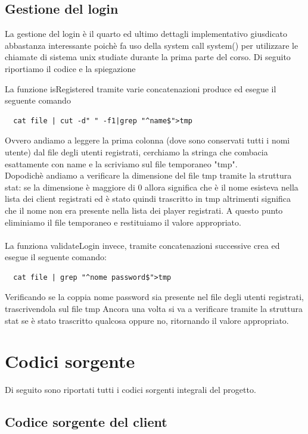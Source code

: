 \documentclass[a4paper]{article}
\begin{document}
\subsection{Gestione del login}
La gestione del login è il quarto ed ultimo dettagli implementativo giusdicato abbastanza interessante poichè
fa uso della system call system() per utilizzare le chiamate di sistema unix studiate durante la prima parte del corso.
Di seguito riportiamo il codice e la spiegazione

La funzione isRegistered tramite varie concatenazioni produce ed esegue il seguente comando 
\begin{verbatim}
  cat file | cut -d" " -f1|grep "^name$">tmp
\end{verbatim}
Ovvero andiamo a leggere la prima colonna (dove sono conservati tutti i nomi utente)
dal file degli utenti registrati, cerchiamo la stringa che combacia esattamente con name e la scriviamo sul
file temporaneo "tmp".\\ Dopodichè andiamo a verificare la dimensione del file tmp tramite la struttura stat: se
la dimensione è maggiore di 0 allora significa che è il nome esisteva nella lista dei client registrati ed è stato quindi trascritto in tmp
altrimenti significa che il nome non era presente nella lista dei player registrati.
A questo punto eliminiamo il file temporaneo e restituiamo il valore appropriato.
\paragraph{}\vspace{0.5mm}

La funziona validateLogin invece, tramite concatenazioni successive crea ed esegue il seguente comando:
\begin{verbatim}
  cat file | grep "^nome password$">tmp
\end{verbatim}
Verificando se la coppia nome password sia presente nel file degli utenti registrati, trascrivendola sul file tmp
Ancora una volta si va a verificare tramite la struttura stat se è stato trascritto qualcosa oppure no, ritornando 
il valore appropriato.
\appendix
\pagebreak
\section{Codici sorgente}
Di seguito sono riportati tutti i codici sorgenti integrali del progetto.
\subsection{Codice sorgente del client}

\end{document}
